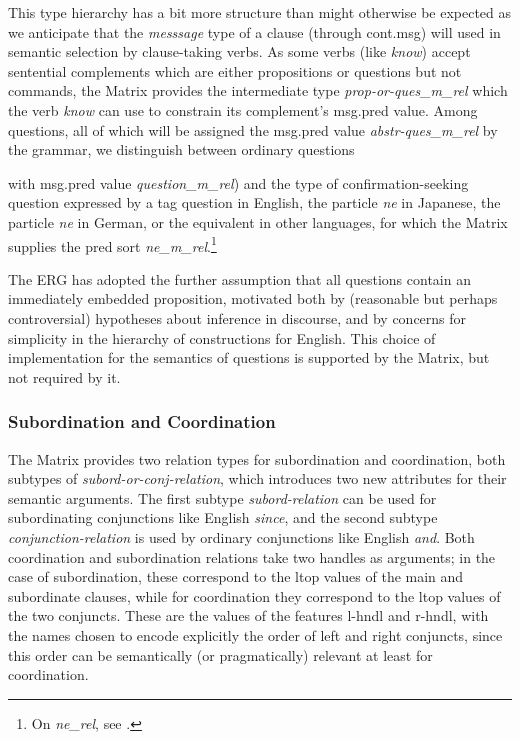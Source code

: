 \documentclass[12pt]{article}
\newcommand{\fn}{\footnote}
\begin{document}
This type hierarchy has a bit more structure than might otherwise be
expected as we anticipate that the {\it messsage} type of a clause (through
{\sc cont.msg}) will used in semantic selection by
clause-taking verbs.  As some verbs (like {\it know}) accept sentential
complements which are either propositions or questions but not commands,
the Matrix provides the intermediate type {\it prop-or-ques\_m\_rel} which
the verb {\it know} can use to constrain its complement's {\sc msg.pred} value.
Among questions, all of which will be assigned the {\sc msg.pred} value
{\it abstr-ques\_m\_rel} by the grammar, we distinguish between
ordinary questions {with {\sc msg.pred} value {\it question\_m\_rel})
and the type of confirmation-seeking question expressed by a tag question in 
English, the particle {\it ne} in Japanese, the particle {\it ne} in German, 
or the equivalent in
other languages, for which the Matrix supplies the pred sort 
{\it ne\_m\_rel}.\fn{On {\it ne\_rel}, see .}

The ERG has adopted the further assumption that all questions contain an
immediately embedded proposition, motivated both by (reasonable but perhaps
controversial) hypotheses about inference in discourse, and by concerns for
simplicity in the hierarchy of constructions for English.  This choice of
implementation for the semantics of questions is supported by the Matrix, but 
not required by it.

\subsubsection{Subordination and Coordination}
\label{coordsec}

The Matrix provides two relation types for subordination and coordination,
both subtypes of {\it subord-or-conj-relation}, which introduces two new
attributes for their semantic arguments.
The first subtype {\it subord-relation} can be used for
subordinating conjunctions like English {\it since}, and the second
subtype {\it conjunction-relation} is used by ordinary conjunctions like 
English 
{\it and}.  Both coordination and subordination relations take two handles as 
arguments; in the
case of subordination, these correspond to the {\sc ltop} values of
the main and subordinate clauses, while for coordination they correspond to
the {\sc ltop} values of the two conjuncts.  These
are the values of the features {\sc l-hndl} and {\sc r-hndl}, with the names
chosen to encode explicitly the order of left and right conjuncts,
since this order can be semantically (or pragmatically) relevant at least for
coordination.

}
\end{document}
